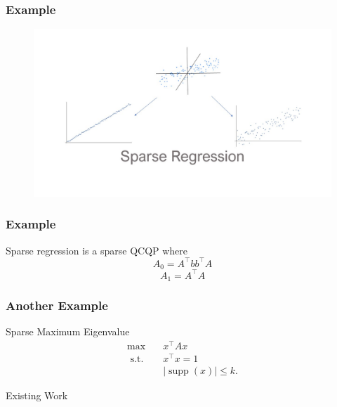 \documentclass{beamer}
\DeclareMathOperator*{\supp}{supp}
\newcommand{\st}{{\text{ s.t. }}}
\begin{document}
\begin{frame}
    \frametitle{Example}
    \begin{figure}[h]
        \centering
        \includegraphics[width=\linewidth]{slide3.jpg}
    \end{figure}
\end{frame}
\begin{frame}
    \frametitle{Example}
    Sparse regression is a sparse QCQP where
    \[
        A_0 = A^{\intercal}bb^{\intercal}A
    \]
    \[
        A_1 = A^{\intercal}A
    \]
\end{frame}
\begin{frame}
    \frametitle{Another Example}
    \begin{block}{Sparse Maximum Eigenvalue}
        \begin{equation*}
            \begin{aligned}
                \max\quad & x^{\intercal}Ax\\
                \st & x^{\intercal}x = 1\\
                    &|\supp(x)| \le k.
            \end{aligned}
        \end{equation*}
        
    \end{block}
\end{frame}
\begin{frame}
    \centering
    \huge
    {\color{gray}Existing Work}
\end{frame}
\end{document}
